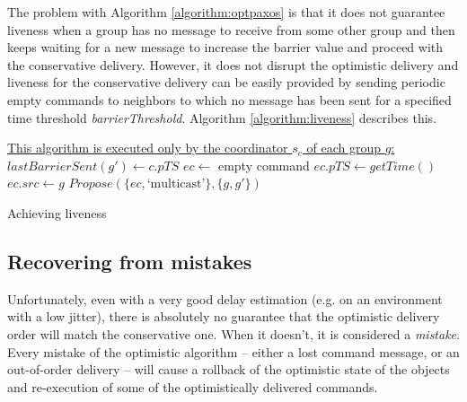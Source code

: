\documentclass[times, 10pt]{article}
\begin{document}
The problem with Algorithm \ref{algorithm:optpaxos} is that it does not guarantee liveness when a group has no message to receive from some other group and then keeps waiting for a new message to increase the barrier value and proceed with the conservative delivery. However, it does not disrupt the optimistic delivery and liveness for the conservative delivery can be easily provided by sending periodic empty commands to neighbors to which no message has been sent for a specified time threshold \textit{barrierThreshold}. Algorithm \ref{algorithm:liveness} describes this.

\begin{algorithm}
\begin{distribalgo}[1]
\STATE \underline{This algorithm is executed only by the coordinator $s_c$ of each group $g$:}
\STATE
{}
    \STATE $lastBarrierSent(g') \leftarrow c.pTS$
  \ENDINDENT
\ENDINDENT
\STATE
{}
  \STATE $ec \leftarrow$ empty command
  \STATE $ec.pTS \leftarrow getTime()$
  \STATE $ec.src \leftarrow g$
  \STATE $Propose(\{ec, \text{`multicast'}\}, \{g,g'\})$
\ENDINDENT
\STATE

\caption{Achieving liveness}
\label{algorithm:liveness}
\end{distribalgo}
\end{algorithm}



\subsection{Recovering from mistakes}

Unfortunately, even with a very good delay estimation (e.g. on an environment with a low jitter), there is absolutely no guarantee that the optimistic delivery order will match the conservative one. When it doesn't, it is considered a \emph{mistake}. Every mistake of the optimistic algorithm -- either a lost command message, or an out-of-order delivery -- will cause a rollback of the optimistic state of the objects and re-execution of some of the optimistically delivered commands.
\end{document}
